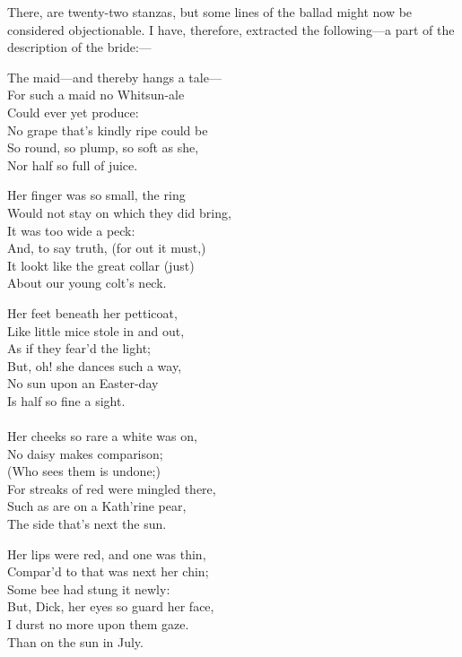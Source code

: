 There, are twenty-two stanzas, but some lines of the ballad might now be
considered objectionable. I have, therefore, extracted the following—a part of
the description of the bride:—
\settowidth{\versewidth}{Would not stay on which they did bring,}
\begin{dcverse}
\begin{patverse}
The maid—and thereby hangs a tale—\\
For such a maid no Whitsun-ale\\
Could ever yet produce:\\
No grape that’s kindly ripe could be\\
So round, so plump, so soft as she,\\
Nor half so full of juice.
\end{patverse}

\begin{patverse}
Her finger was so small, the ring\\
Would not stay on which they did bring,\\
It was too wide a peck:\\
And, to say truth, (for out it must,)\\
It lookt like the great collar (just)\\
About our young colt’s neck.
\end{patverse}

\begin{patverse}
Her feet beneath her petticoat,\\
Like little mice stole in and out,\\
As if they fear’d the light;\\
But, oh! she dances such a way,\\
No sun upon an Easter-day\\
Is half so fine a sight.\\
\quad\quad *\quad\quad *\quad\quad *\quad\quad *\quad\quad *\quad\quad *\\
Her cheeks so rare a white was on,\\
No daisy makes comparison;\\
(Who sees them is undone;)\\
For streaks of red were mingled there,\\
Such as are on a Kath’rine pear,\\
The side that’s next the sun.
\end{patverse}

\begin{patverse}
Her lips were red, and one was thin,\\
Compar’d to that was next her chin;\\
Some bee had stung it newly:\\
But, Dick, her eyes so guard her face,\\
I durst no more upon them gaze.\\
Than on the sun in July.
\end{patverse}
\end{dcverse}

\pagebreak